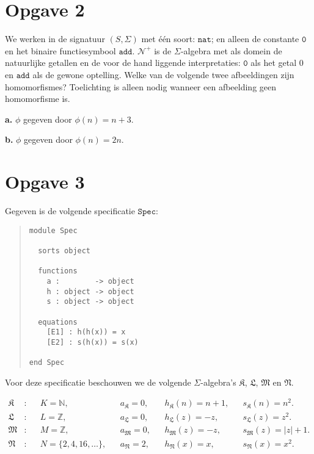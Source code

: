 \documentclass[a4paper,11pt]{article}
\begin{document}
\section*{Opgave 2}

We werken in de signatuur $(S,\Sigma)$ met \'e\'en soort: $\texttt{nat}$; en
alleen de constante $\texttt{0}$ en het binaire functiesymbool
$\texttt{add}$.
$\mathcal{N}^{+}$ is de $\Sigma$-algebra met als domein de natuurlijke
getallen en de voor de hand liggende interpretaties: $\texttt{0}$ als het
getal $0$ en $\texttt{add}$ als de gewone optelling. Welke van de volgende
twee afbeeldingen zijn homomorfismes? Toelichting is alleen nodig wanneer een
afbeelding geen homomorfisme is.

\begin{description}

\item{\bf a.}
$\phi$ gegeven door $\phi(n) = n+3$.

\item{\bf b.}
$\phi$ gegeven door $\phi(n) = 2n$.

\end{description}


\section*{Opgave 3}

Gegeven is de volgende specificatie $\texttt{Spec}$:

\begin{quote}
\begin{verbatim}
module Spec

  sorts object

  functions
    a :        -> object
    h : object -> object
    s : object -> object

  equations
    [E1] : h(h(x)) = x
    [E2] : s(h(x)) = s(x)

end Spec
\end{verbatim}
\end{quote}

Voor deze specificatie beschouwen we de volgende $\Sigma$-algebra's
$\mathfrak{K}$, $\mathfrak{L}$, $\mathfrak{M}$ en $\mathfrak{N}$.

\begin{align*}
\mathfrak{K} &: & &K = \mathbb{N}, & &a_{\mathfrak{K}} = 0, & &h_{\mathfrak{K}}(n) = n+1, & &s_{\mathfrak{K}}(n) = n^{2}. \\
\mathfrak{L} &: & &L = \mathbb{Z}, & &a_{\mathfrak{L}} = 0, & &h_{\mathfrak{L}}(z) = -z, & &s_{\mathfrak{L}}(z) = z^{2}. \\
\mathfrak{M} &: & &M = \mathbb{Z}, & &a_{\mathfrak{M}} = 0, & &h_{\mathfrak{M}}(z) = -z, & &s_{\mathfrak{M}}(z) = |z|+1. \\
\mathfrak{N} &: & &N = \{2,4,16,\ldots\}, & &a_{\mathfrak{N}} = 2, & &h_{\mathfrak{N}}(x) = x, & &s_{\mathfrak{N}}(x) = x^{2}.
\end{align*}
\end{document}
